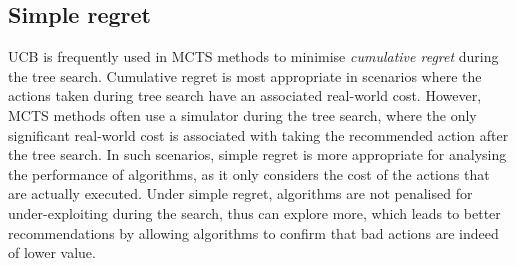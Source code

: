 \documentclass{article}
\newcommand{\todo}[1]{\hl{TODO: #1}}
\theoremstyle{plain}
\begin{document}
    
    \subsection{Simple regret}
    		UCB \cite{auer2002finite} is frequently used in MCTS methods to minimise \textit{cumulative regret} during the tree search. Cumulative regret is most appropriate in scenarios where the actions taken during tree search have an associated real-world cost. However, MCTS methods often use a simulator during the tree search, where the only significant real-world cost is associated with taking the recommended action after the tree search. In such scenarios, simple regret \cite{simple_regret_short,simple_regret_long} is more appropriate for analysing the performance of algorithms, as it only considers the cost of the actions that are actually executed. Under simple regret, algorithms are not penalised for under-exploiting during the search, thus can explore more, which leads to better recommendations by allowing algorithms to confirm that bad actions are indeed of lower value.
\end{document}
